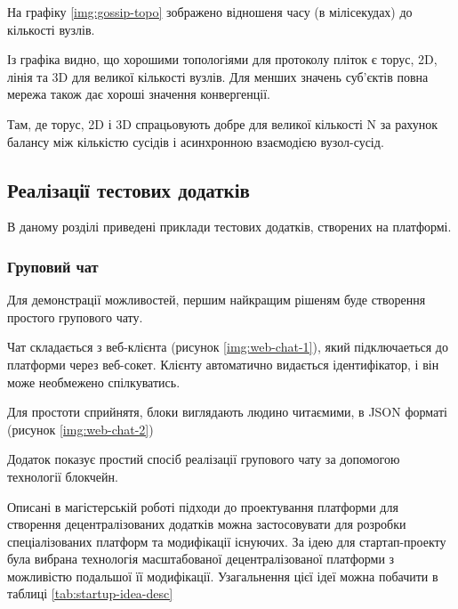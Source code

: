 \documentclass{lib/styles/default-style}
\begin{document}
    На графіку \ref{img:gossip-topo} зображено відношеня часу (в мілісекудах) до кількості вузлів.


    Із графіка видно, що хорошими топологіями для протоколу пліток є торус, 2D,
    лінія та 3D для великої кількості вузлів.
    Для менших значень суб'єктів повна мережа також дає хороші значення конвергенції.

    Там, де торус, 2D і 3D спрацьовують добре для великої кількості N
    за рахунок балансу між кількістю сусідів і асинхронною взаємодією вузол-сусід.
    
\subsection{Реалізації тестових додатків}

В даному розділі приведені приклади тестових додатків, створених на платформі.

\subsubsection{Груповий чат}

Для демонстрації можливостей, першим найкращим рішеням буде створення простого групового чату.

Чат складається з веб-клієнта (рисунок \ref{img:web-chat-1}), який підключаеться до платформи через веб-сокет.
Клієнту автоматично видається ідентифікатор, і він може необмежено спілкуватись.


Для простоти сприйнятя, блоки виглядають людино читаємими, в JSON форматі (рисунок \ref{img:web-chat-2})


Додаток показує простий спосіб реалізації групового чату за допомогою технології блокчейн.


    \startStartupSection
    Описані в магістерській роботі підходи до проектування платформи для створення
    децентралізованих додатків
    можна застосовувати для розробки спеціалізованих платформ та модифікації існуючих.
    За ідею для стартап-проекту була вибрана технологія масштабованої децентралізованої
    платформи з можливістю подальшої її модифікації. Узагальнення цієї ідеї
    можна побачити в таблиці \ref{tab:startup-idea-desc}
\end{document}
